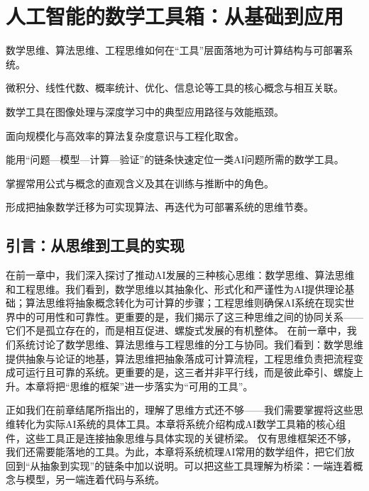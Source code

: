 \chapter{人工智能的数学工具箱：从基础到应用}

\begin{introduction}[本章提要]
  \item 数学思维、算法思维、工程思维如何在“工具”层面落地为可计算结构与可部署系统。
  \item 微积分、线性代数、概率统计、优化、信息论等工具的核心概念与相互关联。
  \item 数学工具在图像处理与深度学习中的典型应用路径与效能瓶颈。
  \item 面向规模化与高效率的算法复杂度意识与工程化取舍。
\end{introduction}
\begin{introduction}[你将收获]
  \item 能用“问题—模型—计算—验证”的链条快速定位一类AI问题所需的数学工具。
  \item 掌握常用公式与概念的直观含义及其在训练与推断中的角色。
  \item 形成把抽象数学迁移为可实现算法、再迭代为可部署系统的思维节奏。
\end{introduction}

\section{引言：从思维到工具的实现}

在前一章中，我们深入探讨了推动AI发展的三种核心思维：数学思维、算法思维和工程思维。我们看到，数学思维以其抽象化、形式化和严谨性为AI提供理论基础；算法思维将抽象概念转化为可计算的步骤；工程思维则确保AI系统在现实世界中的可用性和可靠性。更重要的是，我们揭示了这三种思维之间的协同关系——它们不是孤立存在的，而是相互促进、螺旋式发展的有机整体。
在前一章中，我们系统讨论了数学思维、算法思维与工程思维的分工与协同。我们看到：数学思维提供抽象与论证的地基，算法思维把抽象落成可计算流程，工程思维负责把流程变成可运行且可靠的系统。更重要的是，这三者并非平行线，而是彼此牵引、螺旋上升。本章将把“思维的框架”进一步落实为“可用的工具”。

正如我们在前章结尾所指出的，理解了思维方式还不够——我们需要掌握将这些思维转化为实际AI系统的具体工具。本章将系统介绍构成AI数学工具箱的核心组件，这些工具正是连接抽象思维与具体实现的关键桥梁。
仅有思维框架还不够，我们还需要能落地的工具。为此，本章将系统梳理AI常用的数学组件，把它们放回到“从抽象到实现”的链条中加以说明。可以把这些工具理解为桥梁：一端连着概念与模型，另一端连着代码与系统。

